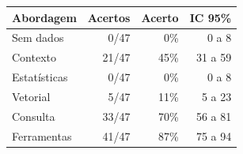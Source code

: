 \begin{tabular}{lrrr}
\toprule
Abordagem & Acertos & Acerto & IC 95\% \\
\midrule
Sem dados & 0/47 & 0\% & 0 a 8 \\
Contexto & 21/47 & 45\% & 31 a 59 \\
Estatísticas & 0/47 & 0\% & 0 a 8 \\
Vetorial & 5/47 & 11\% & 5 a 23 \\
Consulta & 33/47 & 70\% & 56 a 81 \\
Ferramentas & 41/47 & 87\% & 75 a 94 \\
\bottomrule
\end{tabular}
